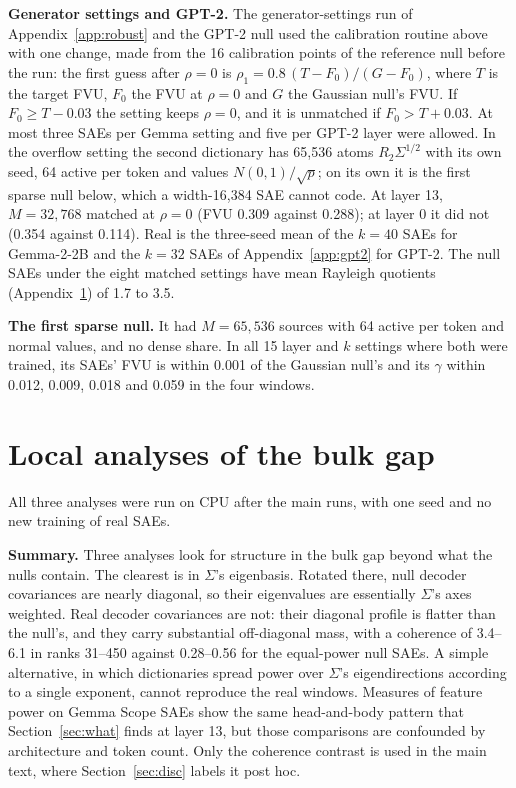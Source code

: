 \documentclass{article}
\newcommand{\Sig}{\Sigma}
\begin{document}
\textbf{Generator settings and GPT-2.} The generator-settings run of Appendix~\ref{app:robust} and the GPT-2 null used the calibration routine above with one change, made from the 16 calibration points of the reference null before the run: the first guess after $\rho=0$ is $\rho_1 = 0.8\,(T-F_0)/(G-F_0)$, where $T$ is the target FVU, $F_0$ the FVU at $\rho=0$ and $G$ the Gaussian null's FVU. If $F_0 \ge T-0.03$ the setting keeps $\rho=0$, and it is unmatched if $F_0 > T+0.03$. At most three SAEs per Gemma setting and five per GPT-2 layer were allowed. In the overflow setting the second dictionary has 65,536 atoms $R_2\Sig^{1/2}$ with its own seed, 64 active per token and values $N(0,1)/\sqrt{p}$; on its own it is the first sparse null below, which a width-16,384 SAE cannot code. At layer 13, $M=32{,}768$ matched at $\rho=0$ (FVU 0.309 against 0.288); at layer 0 it did not (0.354 against 0.114). Real is the three-seed mean of the $k=40$ SAEs for Gemma-2-2B and the $k=32$ SAEs of Appendix~\ref{app:gpt2} for GPT-2. The null SAEs under the eight matched settings have mean Rayleigh quotients (Appendix~\ref{app:local}) of 1.7 to 3.5.

\textbf{The first sparse null.} It had $M=65{,}536$ sources with 64 active per token and normal values, and no dense share. In all 15 layer and $k$ settings where both were trained, its SAEs' FVU is within 0.001 of the Gaussian null's and its $\gamma$ within 0.012, 0.009, 0.018 and 0.059 in the four windows.

\section{Local analyses of the bulk gap}
\label{app:local}

All three analyses were run on CPU after the main runs, with one seed and no new training of real SAEs.

\textbf{Summary.} Three analyses look for structure in the bulk gap beyond what the nulls contain. The clearest is in $\Sig$'s eigenbasis. Rotated there, null decoder covariances are nearly diagonal, so their eigenvalues are essentially $\Sig$'s axes weighted. Real decoder covariances are not: their diagonal profile is flatter than the null's, and they carry substantial off-diagonal mass, with a coherence of 3.4--6.1 in ranks 31--450 against 0.28--0.56 for the equal-power null SAEs. A simple alternative, in which dictionaries spread power over $\Sig$'s eigendirections according to a single exponent, cannot reproduce the real windows. Measures of feature power on Gemma Scope SAEs show the same head-and-body pattern that Section~\ref{sec:what} finds at layer 13, but those comparisons are confounded by architecture and token count. Only the coherence contrast is used in the main text, where Section~\ref{sec:disc} labels it post hoc.
\end{document}
